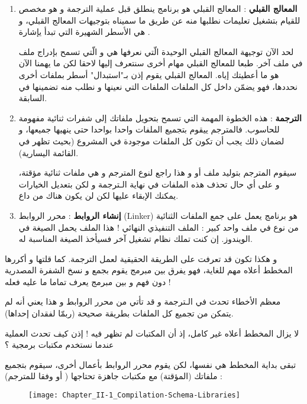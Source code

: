 \begin{enumerate}
  \item \textbf{المعالج القبلي} :
المعالج القبلي هو برنامج ينطلق قبل عملية الترجمة و هو مخصص للقيام بتشغيل تعليمات نطلبها منه عن طريق ما سميناه بتوجيهات المعالج القبلي، و هي الأسطر الشهيرة التي تبدأ يإشارة
\InlineCode{\#}.

لحد الآن توجيهة المعالج القبلي الوحيدة الّتي نعرفها هي
و الّتي تسمح بإدراج ملف في ملف آخر. طبعا للمعالج القبلي مهام أخرى سنتعرف إليها لاحقا لكن ما يهمنا الآن هو ما أعطيتك إياه.
المعالج القبلي يقوم إذن بـ"استبدال" أسطر
بملفات أخرى نحددها، فهو يضمّن داخل كل الملفات
الملفات
التي نعينها و نطلب منه تضمينها في السابقة.
  \item \textbf{الترجمة} : هذه الخطوة المهمة التي تسمح بتحويل ملفاتك إلى شفرات ثنائية مفهومة للحاسوب. فالمترجم ييقوم بتجميع الملفات
واحدا بواحدا حتى ينهيها جميعها، و لضمان ذلك يجب أن تكون كل الملفات موجودة في المشروع (بحيث تظهر في القائمة اليسارية).

سيقوم المترجم بتوليد ملف
أو
و هذا راجع لنوع المترجم و هي ملفات ثنائية مؤقتة، و على أي حال تحذف هذه الملفات في نهاية الـترجمة و لكن بتعديل الخيارات يمكنك الإبقاء عليها لكن لن يكون هناك من داع.
  \item \textbf{إنشاء الروابط} :
محرر الروابط
(\textenglish{Linker})
هو برنامج يعمل على جمع الملفات الثنائية من نوع
في ملف واحد كبير : الملف التنفيذي النهائي ! هذا الملف يحمل الصيغة
في الويندوز. إن كنت تملك نظام تشغيل آخر فسيأخذ الصيغة المناسبة له.
\end{enumerate}

و هكذا تكون قد تعرفت على الطريقة الحقيقية لعمل الترجمة. كما قلتها و أكررها المخطط أعلاه مهم للغاية، فهو يفرق بين مبرمج يقوم بجمع و نسخ الشفرة المصدرية دون فهم و بين مبرمج يعرف تماما ما عليه فعله !

معظم الأخطاء تحدث في الـترجمة و قد تأتي من محرر الروابط و هذا يعني أنه لم يتمكن من تجميع كل الملفات
بطريقة صحيحة (ربمّا لفقدان إحداها).

لا يزال المخطط أعلاه غير كامل، إذ أن المكتبات لم تظهر فيه ! إذن كيف تحدث العملية عندما نستخدم مكتبات برمجية ؟

تبقى بداية المخطط هي نفسها، لكن يقوم محرر الروابط بأعمال أخرى، سيقوم بتجميع ملفاتك
(المؤقتة) مع مكتبات جاهزة تحتاجها 
(
أو
وفقا للمترجم) :

\begin{figure}[H]
	\centering
	\texttt{[image: Chapter\_II-1\_Compilation-Schema-Libraries]}
\end{figure}

